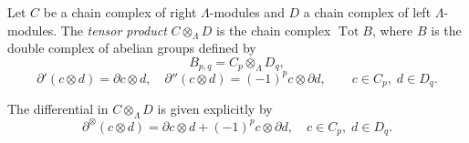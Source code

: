 Let $C$ be a chain complex of right $\Lambda$-modules and $D$ a chain complex of left $\Lambda$-modules. The \emph{tensor product} $C \otimes_{\Lambda} D$ is the chain complex $\operatorname{Tot} B$, where $B$ is the double complex of abelian groups defined by
$$B_{p,q} = C_p \otimes_{\Lambda} D_q,$$
$$\partial'(c \otimes d) = \partial c \otimes d, \quad \partial''(c \otimes d) = (-1)^p c \otimes \partial d, \qquad c \in C_p,\; d \in D_q.$$

The differential in $C \otimes_{\Lambda} D$ is given explicitly by
$$\partial^{\otimes}(c \otimes d) = \partial c \otimes d + (-1)^p c \otimes \partial d, \quad c \in C_p,\; d \in D_q.$$

